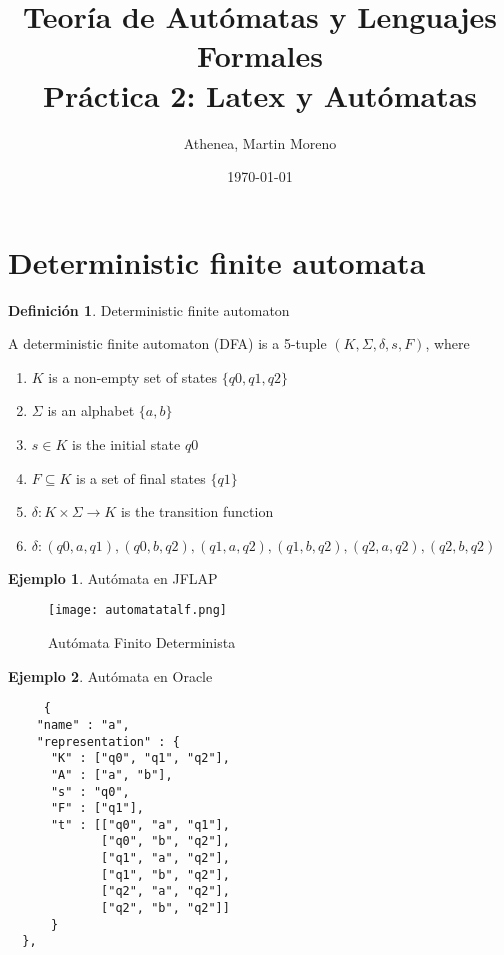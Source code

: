\documentclass[fleqn, 10pt]{article}
\title{Teoría de Autómatas y Lenguajes Formales\\[.4\baselineskip]Práctica 2: Latex y Autómatas}
\author{Athenea, Martin Moreno}
\date{\today}
\theoremstyle{plain}
\theoremstyle{definition}
\newtheorem{definition}{Definición}[section]
\newtheorem{example}{Ejemplo}[section]
\begin{document}
\maketitle

\section{Deterministic finite automata}

\begin{definition}{Deterministic finite automaton }

A deterministic finite automaton (DFA) is a 5-tuple $(K, \Sigma, \delta,s, F)$, where
\begin{enumerate}[label=]
\item $K$ is a non-empty set of states $\{q0,q1,q2\}$
\item $\Sigma$ is an alphabet $\{a,b\}$
\item $s \in K$ is the initial state $q0$
\item $F \subseteq K$ is a set of final states $\{q1\}$
\item $\delta: K \times \Sigma \to K$ is the transition function 
\item $\delta: (q0, a, q1),(q0, b, q2),(q1, a, q2),(q1, b, q2),(q2, a, q2),(q2, b, q2) $
\end{enumerate}
\end{definition} 

\newpage
\begin{example}
Autómata en JFLAP
\begin{figure}
    \centering
    \texttt{[image: automatatalf.png]}
    \caption{Autómata Finito Determinista}
    \label{fig:my_label}
\end{figure}
\end{example}

\begin{example}
Autómata en Oracle

\begin{verbatim}
     {
    "name" : "a",
    "representation" : {
      "K" : ["q0", "q1", "q2"],
      "A" : ["a", "b"],
      "s" : "q0",
      "F" : ["q1"],
      "t" : [["q0", "a", "q1"],
             ["q0", "b", "q2"],
             ["q1", "a", "q2"],
             ["q1", "b", "q2"],
             ["q2", "a", "q2"],
             ["q2", "b", "q2"]]
      }
  },
\end{verbatim}
\end{example}
\end{document}

